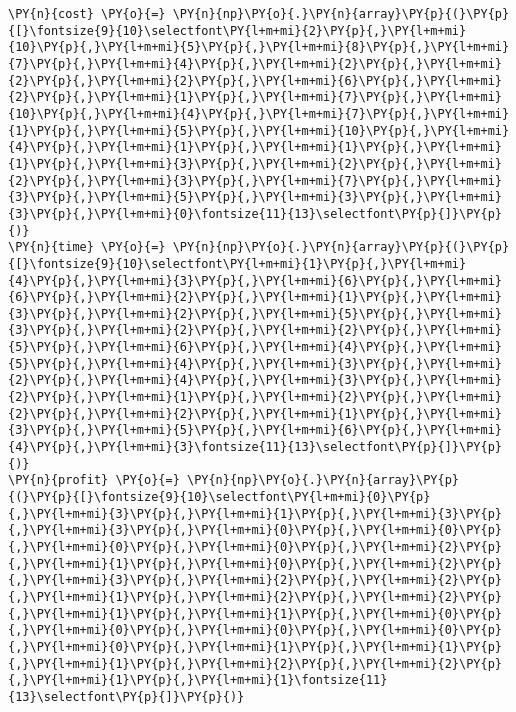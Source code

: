 \begin{tcolorbox}[breakable, size=fbox, boxrule=1pt, pad at break*=1mm,colback=cellbackground, colframe=cellborder]
    \begin{Verbatim}[commandchars=\\\{\}]
\PY{n}{cost} \PY{o}{=} \PY{n}{np}\PY{o}{.}\PY{n}{array}\PY{p}{(}\PY{p}{[}\fontsize{9}{10}\selectfont\PY{l+m+mi}{2}\PY{p}{,}\PY{l+m+mi}{10}\PY{p}{,}\PY{l+m+mi}{5}\PY{p}{,}\PY{l+m+mi}{8}\PY{p}{,}\PY{l+m+mi}{7}\PY{p}{,}\PY{l+m+mi}{4}\PY{p}{,}\PY{l+m+mi}{2}\PY{p}{,}\PY{l+m+mi}{2}\PY{p}{,}\PY{l+m+mi}{2}\PY{p}{,}\PY{l+m+mi}{6}\PY{p}{,}\PY{l+m+mi}{2}\PY{p}{,}\PY{l+m+mi}{1}\PY{p}{,}\PY{l+m+mi}{7}\PY{p}{,}\PY{l+m+mi}{10}\PY{p}{,}\PY{l+m+mi}{4}\PY{p}{,}\PY{l+m+mi}{7}\PY{p}{,}\PY{l+m+mi}{1}\PY{p}{,}\PY{l+m+mi}{5}\PY{p}{,}\PY{l+m+mi}{10}\PY{p}{,}\PY{l+m+mi}{4}\PY{p}{,}\PY{l+m+mi}{1}\PY{p}{,}\PY{l+m+mi}{1}\PY{p}{,}\PY{l+m+mi}{1}\PY{p}{,}\PY{l+m+mi}{3}\PY{p}{,}\PY{l+m+mi}{2}\PY{p}{,}\PY{l+m+mi}{2}\PY{p}{,}\PY{l+m+mi}{3}\PY{p}{,}\PY{l+m+mi}{7}\PY{p}{,}\PY{l+m+mi}{3}\PY{p}{,}\PY{l+m+mi}{5}\PY{p}{,}\PY{l+m+mi}{3}\PY{p}{,}\PY{l+m+mi}{3}\PY{p}{,}\PY{l+m+mi}{0}\fontsize{11}{13}\selectfont\PY{p}{]}\PY{p}{)}
\PY{n}{time} \PY{o}{=} \PY{n}{np}\PY{o}{.}\PY{n}{array}\PY{p}{(}\PY{p}{[}\fontsize{9}{10}\selectfont\PY{l+m+mi}{1}\PY{p}{,}\PY{l+m+mi}{4}\PY{p}{,}\PY{l+m+mi}{3}\PY{p}{,}\PY{l+m+mi}{6}\PY{p}{,}\PY{l+m+mi}{6}\PY{p}{,}\PY{l+m+mi}{2}\PY{p}{,}\PY{l+m+mi}{1}\PY{p}{,}\PY{l+m+mi}{3}\PY{p}{,}\PY{l+m+mi}{2}\PY{p}{,}\PY{l+m+mi}{5}\PY{p}{,}\PY{l+m+mi}{3}\PY{p}{,}\PY{l+m+mi}{2}\PY{p}{,}\PY{l+m+mi}{2}\PY{p}{,}\PY{l+m+mi}{5}\PY{p}{,}\PY{l+m+mi}{6}\PY{p}{,}\PY{l+m+mi}{4}\PY{p}{,}\PY{l+m+mi}{5}\PY{p}{,}\PY{l+m+mi}{4}\PY{p}{,}\PY{l+m+mi}{3}\PY{p}{,}\PY{l+m+mi}{2}\PY{p}{,}\PY{l+m+mi}{4}\PY{p}{,}\PY{l+m+mi}{3}\PY{p}{,}\PY{l+m+mi}{2}\PY{p}{,}\PY{l+m+mi}{1}\PY{p}{,}\PY{l+m+mi}{2}\PY{p}{,}\PY{l+m+mi}{2}\PY{p}{,}\PY{l+m+mi}{2}\PY{p}{,}\PY{l+m+mi}{1}\PY{p}{,}\PY{l+m+mi}{3}\PY{p}{,}\PY{l+m+mi}{5}\PY{p}{,}\PY{l+m+mi}{6}\PY{p}{,}\PY{l+m+mi}{4}\PY{p}{,}\PY{l+m+mi}{3}\fontsize{11}{13}\selectfont\PY{p}{]}\PY{p}{)}
\PY{n}{profit} \PY{o}{=} \PY{n}{np}\PY{o}{.}\PY{n}{array}\PY{p}{(}\PY{p}{[}\fontsize{9}{10}\selectfont\PY{l+m+mi}{0}\PY{p}{,}\PY{l+m+mi}{3}\PY{p}{,}\PY{l+m+mi}{1}\PY{p}{,}\PY{l+m+mi}{3}\PY{p}{,}\PY{l+m+mi}{3}\PY{p}{,}\PY{l+m+mi}{0}\PY{p}{,}\PY{l+m+mi}{0}\PY{p}{,}\PY{l+m+mi}{0}\PY{p}{,}\PY{l+m+mi}{0}\PY{p}{,}\PY{l+m+mi}{2}\PY{p}{,}\PY{l+m+mi}{1}\PY{p}{,}\PY{l+m+mi}{0}\PY{p}{,}\PY{l+m+mi}{2}\PY{p}{,}\PY{l+m+mi}{3}\PY{p}{,}\PY{l+m+mi}{2}\PY{p}{,}\PY{l+m+mi}{2}\PY{p}{,}\PY{l+m+mi}{1}\PY{p}{,}\PY{l+m+mi}{2}\PY{p}{,}\PY{l+m+mi}{2}\PY{p}{,}\PY{l+m+mi}{1}\PY{p}{,}\PY{l+m+mi}{1}\PY{p}{,}\PY{l+m+mi}{0}\PY{p}{,}\PY{l+m+mi}{0}\PY{p}{,}\PY{l+m+mi}{0}\PY{p}{,}\PY{l+m+mi}{0}\PY{p}{,}\PY{l+m+mi}{0}\PY{p}{,}\PY{l+m+mi}{1}\PY{p}{,}\PY{l+m+mi}{1}\PY{p}{,}\PY{l+m+mi}{1}\PY{p}{,}\PY{l+m+mi}{2}\PY{p}{,}\PY{l+m+mi}{2}\PY{p}{,}\PY{l+m+mi}{1}\PY{p}{,}\PY{l+m+mi}{1}\fontsize{11}{13}\selectfont\PY{p}{]}\PY{p}{)}

\end{Verbatim}
\end{tcolorbox}
